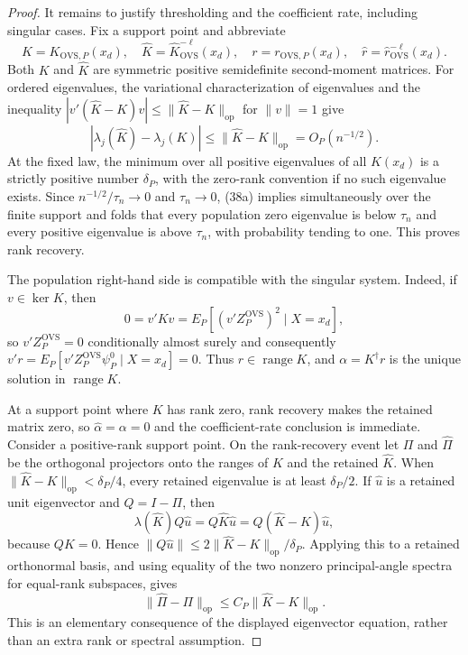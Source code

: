 \documentclass{article}
\begin{document}
\begin{proof}
It remains to justify thresholding and the coefficient rate, including singular cases.  Fix a support point and abbreviate
\[
K=K_{\mathrm{OVS},P}(x_d),\quad
\widehat K=\widehat K_{\mathrm{OVS}}^{-\ell}(x_d),\quad
r=r_{\mathrm{OVS},P}(x_d),\quad
\widehat r=\widehat r_{\mathrm{OVS}}^{-\ell}(x_d).
\]
Both \(K\) and \(\widehat K\) are symmetric positive semidefinite second-moment matrices.  For ordered eigenvalues, the variational characterization of eigenvalues and the inequality \(|v'(\widehat K-K)v|\le\|\widehat K-K\|_{\mathrm{op}}\) for \(\|v\|=1\) give
\[
|\lambda_j(\widehat K)-\lambda_j(K)|
\le\|\widehat K-K\|_{\mathrm{op}}=O_P(n^{-1/2}).
\tag{38a}
\]
At the fixed law, the minimum over all positive eigenvalues of all \(K(x_d)\) is a strictly positive number \(\delta_P\), with the zero-rank convention if no such eigenvalue exists.  Since \(n^{-1/2}/\tau_n\to0\) and \(\tau_n\to0\), (38a) implies simultaneously over the finite support and folds that every population zero eigenvalue is below \(\tau_n\) and every positive eigenvalue is above \(\tau_n\), with probability tending to one.  This proves rank recovery.

The population right-hand side is compatible with the singular system.  Indeed, if \(v\in\ker K\), then
\[
0=v'Kv=E_P[(v'Z_P^{\mathrm{OVS}})^2\mid X=x_d],
\]
so \(v'Z_P^{\mathrm{OVS}}=0\) conditionally almost surely and consequently \(v'r=E_P[v'Z_P^{\mathrm{OVS}}\psi_P^0\mid X=x_d]=0\).  Thus \(r\in\operatorname{range}K\), and \(\alpha=K^\dagger r\) is the unique solution in \(\operatorname{range}K\).

At a support point where \(K\) has rank zero, rank recovery makes the retained matrix zero, so \(\widehat\alpha=\alpha=0\) and the coefficient-rate conclusion is immediate.  Consider a positive-rank support point.  On the rank-recovery event let \(\Pi\) and \(\widehat\Pi\) be the orthogonal projectors onto the ranges of \(K\) and the retained \(\widehat K\).  When \(\|\widehat K-K\|_{\mathrm{op}}<\delta_P/4\), every retained eigenvalue is at least \(\delta_P/2\).  If \(\widehat u\) is a retained unit eigenvector and \(Q=I-\Pi\), then
\[
\lambda(\widehat K)Q\widehat u
=Q\widehat K\widehat u
=Q(\widehat K-K)\widehat u,
\]
because \(QK=0\).  Hence \(\|Q\widehat u\|\le 2\|\widehat K-K\|_{\mathrm{op}}/\delta_P\).  Applying this to a retained orthonormal basis, and using equality of the two nonzero principal-angle spectra for equal-rank subspaces, gives
\[
\|\widehat\Pi-\Pi\|_{\mathrm{op}}
\le C_P\|\widehat K-K\|_{\mathrm{op}}.
\tag{38b}
\]
This is an elementary consequence of the displayed eigenvector equation, rather than an extra rank or spectral assumption.


\end{proof}
\end{document}
